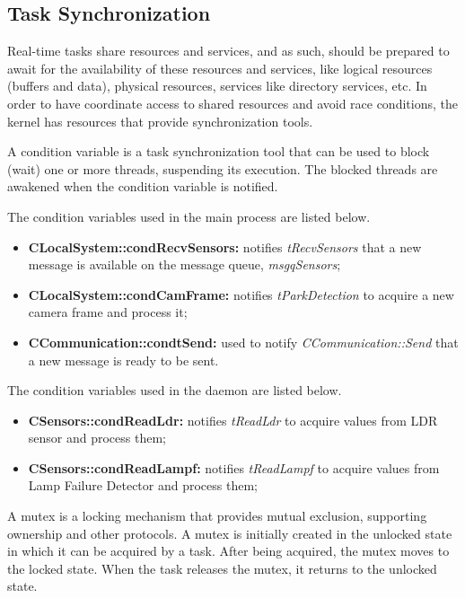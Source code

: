 \clearpage
\subsection{Task Synchronization}
Real-time tasks share resources and services, and as such, should be prepared to await for the availability of these resources and services, like logical resources (buffers and data), physical resources, services like directory services, etc. In order to have coordinate access to shared resources and avoid race conditions, the kernel has resources that provide synchronization tools. 


A condition variable is a task synchronization tool that can be used to block (wait) one or more threads, suspending its execution. The blocked threads are awakened when the condition variable is notified. 

The condition variables used in the main process are listed below.

\begin{itemize}
	\item \textbf{CLocalSystem::condRecvSensors:} notifies \textit{tRecvSensors} that a new message is available on the message queue, \textit{msgqSensors};

	\item \textbf{CLocalSystem::condCamFrame:} notifies \textit{tParkDetection} to acquire a new camera frame and process it;

	\item \textbf{CCommunication::condtSend:} used to notify \textit{CCommunication::Send} that a new message is ready to be sent.
\end{itemize}

The condition variables used in the daemon are listed below.

\begin{itemize}
	\item \textbf{CSensors::condReadLdr:} notifies \textit{tReadLdr} to acquire values from LDR sensor and process them;

	\item \textbf{CSensors::condReadLampf:} notifies \textit{tReadLampf} to acquire values from Lamp Failure Detector and process them;
\end{itemize}


A mutex is a locking mechanism that provides mutual exclusion, supporting ownership and other protocols. A mutex is initially created in the unlocked state in which it can be acquired by a task. After being acquired, the mutex moves to the locked state. When the task releases the mutex, it returns to the unlocked state.

